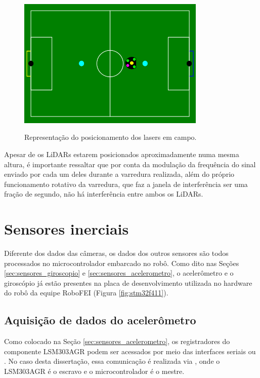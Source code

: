 \documentclass[acronym, symbols, table, deposito]{fei}
\begin{document}
	\begin{figure}[!htb]
		\centering
		\caption{Representação do posicionamento dos lasers em campo.}
		\includegraphics[width=0.80\textwidth]{representacao_teste_lidar_cameras.png}
		\label{fig:representacao_teste_lidar}
	\end{figure}

	Apesar de os LiDARs estarem posicionados aproximadamente numa mesma altura, é importante ressaltar que por conta da modulação da frequência do sinal enviado por cada um deles durante a varredura realizada, além do próprio funcionamento rotativo da varredura, que faz a janela de interferência ser uma fração de segundo, não há interferência entre ambos os LiDARs.
	
	\section{Sensores inerciais}
	
	Diferente dos dados das câmeras, os dados dos outros sensores são todos processados no microcontrolador embarcado no robô. Como dito nas Seções \ref{sec:sensores_giroscopio} e \ref{sec:sensores_acelerometro}, o acelerômetro e o giroscópio já estão presentes na placa de desenvolvimento utilizada no hardware do robô da equipe RoboFEI (Figura \ref{fig:stm32f411}).
	
	\subsection{Aquisição de dados do acelerômetro}
	
	Como colocado na Seção \ref{sec:sensores_acelerometro}, os registradores do componente LSM303AGR podem ser acessados por meio das interfaces seriais  ou . No caso desta dissertação, essa comunicação é realizada via , onde o LSM303AGR é o escravo e o microcontrolador é o mestre.
	
\end{document}

